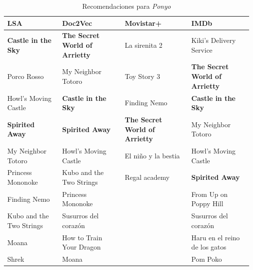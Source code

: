 \documentclass[withindex, glossary]{cam-thesis}
\begin{document}
\begin{table}
    \begin{tabularx}{\textwidth}{XXXX}
        \toprule
        \hiderowcolors{}LSA & Doc2Vec & Movistar+ & IMDb\\
        \midrule
        \showrowcolors{}\textbf{Castle in the Sky} & \textbf{The Secret World of Arrietty} & La sirenita 2 & Kiki's Delivery Service \\
        Porco Rosso & My Neighbor Totoro & Toy Story 3 & \textbf{The Secret World of Arrietty}\\
        Howl's Moving Castle & \textbf{Castle in the Sky} & Finding Nemo & \textbf{Castle in the Sky}\\
        \textbf{Spirited Away} & \textbf{Spirited Away} & \textbf{The Secret World of Arrietty} & My Neighbor Totoro\\
        My Neighbor Totoro & Howl's Moving Castle & El niño y la bestia & Howl's Moving Castle\\
        Princess Mononoke & Kubo and the Two Strings & Regal academy & \textbf{Spirited Away}\\
        Finding Nemo & Princess Mononoke & & From Up on Poppy Hill\\
        Kubo and the Two Strings & Susurros del corazón & & Susurros del corazón\\
        Moana & How to Train Your Dragon & & Haru en el reino de los gatos\\
        Shrek & Moana & & Pom Poko\\
        \bottomrule
    \end{tabularx}
    \caption{Recomendaciones para \textit{Ponyo}}
\end{table}
\end{document}

